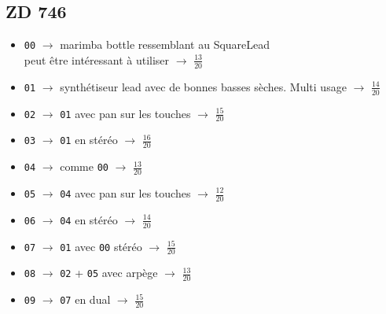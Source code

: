\documentclass[a4paper, 13pt]{article}
\begin{document}
\vspace{0cm}
\subsection*{ZD 746}
\begin{itemize}
    \item \texttt{00} $\rightarrow$ marimba bottle ressemblant au SquareLead \\ 
    peut être intéressant à utiliser $\rightarrow$ \Large{$\frac{13}{20}$} \normalsize \vspace{0.2cm}
    \item \texttt{01} $\rightarrow$ synthétiseur lead avec de bonnes basses sèches. Multi usage $\rightarrow$ \Large{$\frac{14}{20}$} \normalsize \vspace{0.2cm}
    \item \texttt{02} $\rightarrow$ \texttt{01} avec pan sur les touches $\rightarrow$ \Large{$\frac{15}{20}$} \normalsize \vspace{0.2cm}
    \item \texttt{03} $\rightarrow$ \texttt{01} en stéréo $\rightarrow$ \Large{$\frac{16}{20}$} \normalsize \vspace{0.2cm}
    \item \texttt{04} $\rightarrow$ comme \texttt{00} $\rightarrow$ \Large{$\frac{13}{20}$} \normalsize \vspace{0.2cm}
    \item \texttt{05} $\rightarrow$ \texttt{04} avec pan sur les touches $\rightarrow$ \Large{$\frac{12}{20}$} \normalsize \vspace{0.2cm}
    \item \texttt{06} $\rightarrow$ \texttt{04} en stéréo $\rightarrow$ \Large{$\frac{14}{20}$} \normalsize \vspace{0.2cm}
    \item \texttt{07} $\rightarrow$ \texttt{01} avec \texttt{00} stéréo $\rightarrow$ \Large{$\frac{15}{20}$} \normalsize \vspace{0.2cm}
    \item \texttt{08} $\rightarrow$ \texttt{02} + \texttt{05} avec arpège $\rightarrow$ \Large{$\frac{13}{20}$} \normalsize \vspace{0.2cm}
    \item \texttt{09} $\rightarrow$ \texttt{07} en dual $\rightarrow$ \Large{$\frac{15}{20}$} \normalsize \vspace{0.2cm}
\end{itemize}
\end{document}
